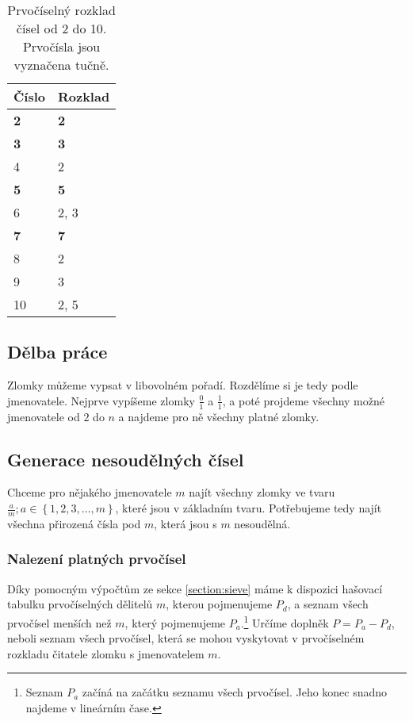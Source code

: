 \documentclass{article}
\begin{document}
\begin{table}[ht]
    \centering
    \begin{tabular}{|l|l|}
        \hline
        Číslo      & Rozklad    \\
        \hline
        \textbf{2} & \textbf{2} \\
        \textbf{3} & \textbf{3} \\
        4          & 2          \\
        \textbf{5} & \textbf{5} \\
        6          & 2, 3       \\
        \textbf{7} & \textbf{7} \\
        8          & 2          \\
        9          & 3          \\
        10         & 2, 5       \\
        \hline
    \end{tabular}

    \caption[Prvočíselný rozklad čísel od 2 do 10]{Prvočíselný rozklad čísel od 2 do 10. Prvočísla jsou vyznačena tučně.}
    \label{table:sieve}
\end{table}

\subsection{Dělba práce}

Zlomky můžeme vypsat v libovolném pořadí. Rozdělíme si je tedy podle jmenovatele. Nejprve vypíšeme zlomky $\frac{0}{1}$ a $\frac{1}{1}$, a poté projdeme všechny možné jmenovatele od $2$ do $n$ a najdeme pro ně všechny platné zlomky.

\subsection{Generace nesoudělných čísel}

Chceme pro nějakého jmenovatele $m$ najít všechny zlomky ve tvaru $\frac{a}{m}; a \in \left\{1, 2, 3, \dots, m\right\}$, které jsou v základním tvaru. Potřebujeme tedy najít všechna přirozená čísla pod $m$, která jsou s $m$ nesoudělná.

\subsubsection{Nalezení platných prvočísel}
\label{section:valid-primes}

Díky pomocným výpočtům ze sekce \ref{section:sieve} máme k dispozici hašovací tabulku prvočíselných dělitelů $m$, kterou pojmenujeme $P_d$, a seznam všech prvočísel menších než $m$, který pojmenujeme $P_a$.\footnote{Seznam $P_a$ začíná na začátku seznamu všech prvočísel. Jeho konec snadno najdeme v lineárním čase.} Určíme doplněk $P = P_a - P_d$, neboli seznam všech prvočísel, která se mohou vyskytovat v prvočíselném rozkladu čitatele zlomku s jmenovatelem $m$.
\end{document}
